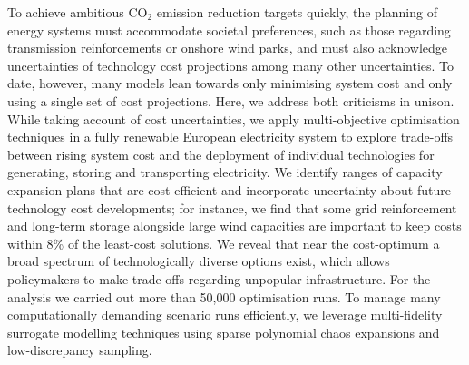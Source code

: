 To achieve ambitious CO$_2$ emission reduction targets quickly, the planning of
energy systems must accommodate societal preferences, such as those regarding
transmission reinforcements or onshore wind parks, and must also acknowledge
uncertainties of technology cost projections among many other uncertainties. To
date, however, many models lean towards only minimising system cost and only
using a single set of cost projections. Here, we address both criticisms in
unison. While taking account of cost uncertainties, we apply multi-objective
optimisation techniques in a fully renewable European electricity system to
explore trade-offs between rising system cost and the deployment of individual
technologies for generating, storing and transporting electricity. We identify
ranges of capacity expansion plans that are cost-efficient and incorporate
uncertainty about future technology cost developments; for instance, we find
that some grid reinforcement and long-term storage alongside large wind
capacities are important to keep costs within 8\% of the least-cost solutions.
We reveal that near the cost-optimum a broad spectrum of technologically diverse
options exist, which allows policymakers to make trade-offs regarding unpopular
infrastructure. For the analysis we carried out more than 50,000 optimisation
runs. To manage many computationally demanding scenario runs efficiently, we
leverage multi-fidelity surrogate modelling techniques using sparse polynomial
chaos expansions and low-discrepancy sampling.
